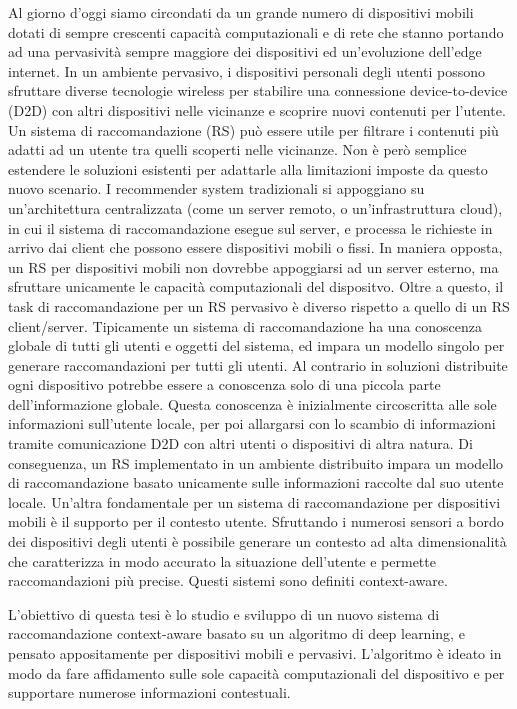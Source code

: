 \documentclass[12pt,italian]{report}
\begin{document}
Al giorno d'oggi siamo circondati da un grande numero di dispositivi mobili dotati di sempre crescenti capacità computazionali e di rete che stanno portando ad una pervasività sempre maggiore dei dispositivi ed un'evoluzione dell'edge internet. In un ambiente pervasivo, i dispositivi personali degli utenti possono sfruttare diverse tecnologie wireless per stabilire una connessione device-to-device (D2D) con altri dispositivi nelle vicinanze e scoprire nuovi contenuti per l'utente. Un sistema di raccomandazione (RS) può essere utile per filtrare i contenuti più adatti ad un utente tra quelli 
scoperti nelle vicinanze. Non è però semplice estendere le soluzioni esistenti per adattarle alla 
limitazioni imposte da questo nuovo scenario. I recommender system tradizionali si appoggiano su un'architettura centralizzata (come  un server remoto, o un'infrastruttura cloud), in cui il sistema di raccomandazione esegue sul server, e processa 
le richieste in arrivo dai client che possono essere dispositivi mobili o fissi. In maniera opposta, un RS per dispositivi mobili non dovrebbe appoggiarsi ad un server esterno, ma sfruttare unicamente le capacità computazionali del dispositvo. Oltre a questo, il task 
di raccomandazione per un RS pervasivo è diverso rispetto a quello di un RS client/server. Tipicamente un sistema di raccomandazione ha una conoscenza globale di tutti gli utenti e oggetti del sistema, ed impara un modello singolo per generare raccomandazioni per tutti gli utenti. Al contrario in soluzioni distribuite ogni dispositivo potrebbe
essere a conoscenza solo di una piccola parte dell'informazione globale. Questa conoscenza è inizialmente 
circoscritta alle sole informazioni sull'utente locale, per poi allargarsi con lo scambio di informazioni 
tramite comunicazione D2D con altri utenti o dispositivi di altra natura. Di conseguenza, 
un RS implementato in un ambiente distribuito impara un modello di raccomandazione basato unicamente 
sulle informazioni raccolte dal suo utente locale. Un'altra fondamentale per un sistema di raccomandazione per dispositivi mobili è il 
supporto per il contesto utente. Sfruttando i numerosi sensori a bordo dei dispositivi degli utenti è possibile 
generare un contesto ad alta dimensionalità che caratterizza in modo accurato la situazione dell'utente e permette raccomandazioni più precise. Questi sistemi sono definiti context-aware.

L'obiettivo di questa tesi è lo studio e sviluppo di un nuovo sistema di raccomandazione context-aware basato su un algoritmo di deep learning, e pensato appositamente per dispositivi mobili e pervasivi. L'algoritmo è ideato in modo da fare affidamento sulle sole capacità computazionali del dispositivo e per supportare numerose informazioni contestuali.
\end{document}
